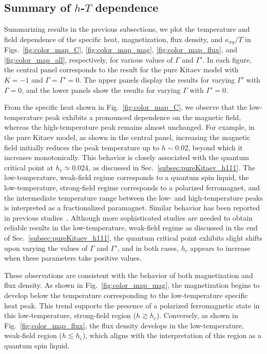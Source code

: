 \documentclass[twocolumn,superscriptaddress,showpacs, longbibliography, aps, prx]{revtex4-2}
\begin{document}
\subsection{Summary of $h$-$T$ dependence}
\label{sec:summary_of_temp_field}
Summarizing results in the previous subsections, we plot the temperature and field dependence of the specific heat, magnetization, flux density, and $\kappa_{xy}/T$ in Figs.~\ref{fig:color_map_C}, \ref{fig:color_map_mag}, \ref{fig:color_map_flux}, and \ref{fig:color_map_all}, respectively, for various values of $\Gamma$ and $\Gamma'$. 
In each figure, the central panel corresponds to the result for the pure Kitaev model with $K=-1$ and $\Gamma=\Gamma'=0$. 
The upper panels display the results for varying $\Gamma'$ with $\Gamma=0$, and the lower panels show the results for varying $\Gamma$ with $\Gamma'=0$. 

From the specific heat shown in Fig.~\ref{fig:color_map_C}, we observe that the low-temperature peak exhibits a pronounced dependence on the magnetic field, whereas the high-temperature peak remains almost unchanged. For example, in the pure Kitaev model, as shown in the central panel, increasing the magnetic field initially reduces the peak temperature up to $h \sim 0.02$, beyond which it increases monotonically. This behavior is closely associated with the quantum critical point at $h_c \simeq 0.024$, as discussed in Sec.~\ref{subsec:pureKitaev_h111}. 
The low-temperature, weak-field regime corresponds to a quantum spin liquid, the low-temperature, strong-field regime corresponds to a polarized ferromagnet, and the intermediate temperature range between the low- and high-temperature peaks is interpreted as a fractionalized paramagnet. Similar behavior has been reported in previous studies~\cite{YoshitakeNKM2020,Li2020,LiLXGQLS2024}.
Although more sophisticated studies are needed to obtain reliable results in the low-temperature, weak-field regime as discussed in the end of Sec.~\ref{subsec:pureKitaev_h111}, the quantum critical point exhibits slight shifts upon varying the values of $\Gamma$ and $\Gamma'$, and in both cases, $h_c$ appears to increase when these parameters take positive values. 

These observations are consistent with the behavior of both magnetization and flux density. 
As shown in Fig.~\ref{fig:color_map_mag}, the magnetization begins to develop below the temperature corresponding to the low-temperature specific heat peak. 
This trend supports the presence of a polarized ferromagnetic state in this low-temperature, strong-field region ($h \gtrsim h_c$). 
Conversely, as shown in Fig.~\ref{fig:color_map_flux}, the flux density develops in the low-temperature, weak-field region ($h \lesssim h_c$), which aligns with the interpretation of this region as a quantum spin liquid.
\end{document}
